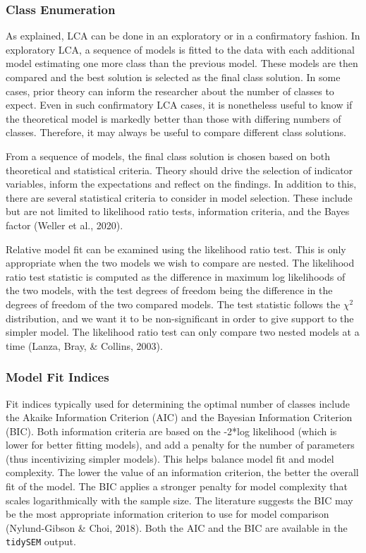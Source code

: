 \documentclass[
  ,man,floatsintext]{apa6}
\begin{document}
\hypertarget{class-enumeration}{%
\subsubsection{Class Enumeration}\label{class-enumeration}}

As explained, LCA can be done in an exploratory or in a confirmatory fashion.
In exploratory LCA, a sequence of models is fitted to the data
with each additional model estimating one more class than the previous model.
These models are then compared
and the best solution is selected as the final class solution.
In some cases, prior theory can inform the researcher
about the number of classes to expect.
Even in such confirmatory LCA cases,
it is nonetheless useful to know if the theoretical model
is markedly better than those with differing numbers of classes.
Therefore, it may always be useful to compare different class solutions.

From a sequence of models, the final class solution is chosen
based on both theoretical and statistical criteria.
Theory should drive the selection of indicator variables,
inform the expectations and reflect on the findings.
In addition to this, there are several statistical criteria
to consider in model selection.
These include but are not limited to likelihood ratio tests,
information criteria,
and the Bayes factor (Weller et al., 2020).

Relative model fit can be examined using the likelihood ratio test.
This is only appropriate when the two models we wish to compare are nested.
The likelihood ratio test statistic is computed as
the difference in maximum log likelihoods of the two models,
with the test degrees of freedom being
the difference in the degrees of freedom of the two compared models.
The test statistic follows the \(\chi^2\) distribution,
and we want it to be non-significant
in order to give support to the simpler model.
The likelihood ratio test can only compare two nested models at a time (Lanza, Bray, \& Collins, 2003).

\hypertarget{model-fit-indices}{%
\subsubsection{Model Fit Indices}\label{model-fit-indices}}

Fit indices typically used for determining the optimal number of classes include
the Akaike Information Criterion (AIC)
and the Bayesian Information Criterion (BIC).
Both information criteria are based on the -2*log likelihood
(which is lower for better fitting models),
and add a penalty for the number of parameters (thus incentivizing simpler models).
This helps balance model fit and model complexity.
The lower the value of an information criterion,
the better the overall fit of the model.
The BIC applies a stronger penalty for model complexity
that scales logarithmically with the sample size.
The literature suggests the BIC may be
the most appropriate information criterion to use for model comparison (Nylund-Gibson \& Choi, 2018).
Both the AIC and the BIC are available in the \texttt{tidySEM} output.
\end{document}
